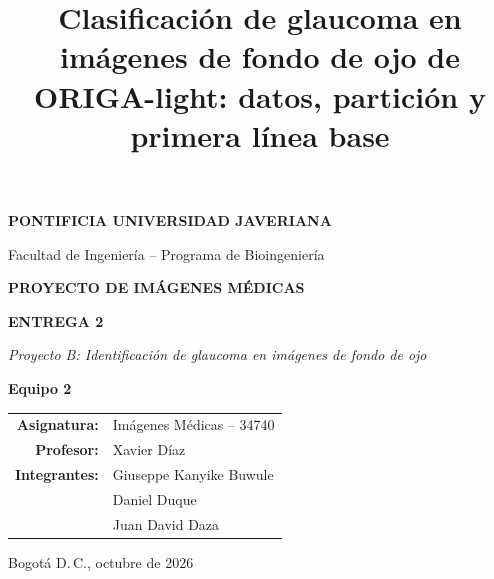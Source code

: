 \documentclass[pdflatex,sn-mathphys-num]{sn-jnl}%
\theoremstyle{thmstyleone}%
\theoremstyle{thmstyletwo}%
\theoremstyle{thmstylethree}%
\begin{document}
\renewcommand{\tablename}{Tabla}
\renewcommand{\figurename}{Figura}
\renewcommand{\refname}{Referencias}
\renewcommand{\appendixname}{Anexo}
\renewcommand{\contentsname}{Contenido}

\begin{titlepage}
\centering
{\large\textbf{PONTIFICIA UNIVERSIDAD JAVERIANA}\par}
\vspace{0.3cm}
{Facultad de Ingeniería -- Programa de Bioingeniería\par}
\vspace{2.5cm}
{\Large\textbf{PROYECTO DE IMÁGENES MÉDICAS}\par}
\vspace{0.4cm}
{\Large\textbf{ENTREGA 2}\par}
\vspace{1.2cm}
{\large\textit{Proyecto B: Identificación de glaucoma en imágenes de fondo de ojo}\par}
\vspace{0.6cm}
{\large\textbf{Equipo 2}\par}
\vspace{2cm}
\begin{tabular}{rl}
\textbf{Asignatura:} & Imágenes Médicas -- 34740\\
\textbf{Profesor:}   & Xavier Díaz\\[0.4cm]
\textbf{Integrantes:} & Giuseppe Kanyike Buwule\\
                      & Daniel Duque\\
                      & Juan David Daza\\
\end{tabular}
\vfill
{Bogotá D.\,C., octubre de 2026\par}
\end{titlepage}

\title[Entrega 2 -- Proyecto B -- Glaucoma]{Clasificación de glaucoma en imágenes de fondo de ojo de ORIGA-light: datos, partición y primera línea base}

\author{ }
\author{ }
\author{ }
\end{document}
